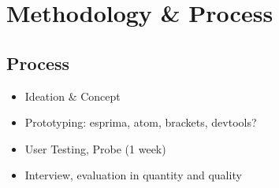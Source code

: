 \chapter{Methodology \& Process}\label{methodology-process}

\section{Process}\label{process}

\begin{itemize}
\itemsep1pt\parskip0pt
\item
  Ideation \& Concept
\item
  Prototyping: esprima, atom, brackets, devtools?
\item
  User Testing, Probe (1 week)
\item
  Interview, evaluation in quantity and quality
\end{itemize}
